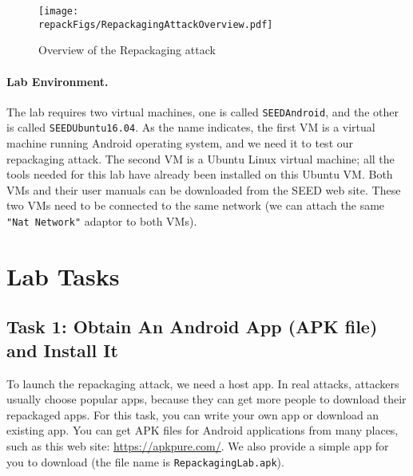 \begin{figure}[htb]
  \begin{center}
    \texttt{[image: \\repackFigs/RepackagingAttackOverview.pdf]}
  \end{center}
  \caption{Overview of the Repackaging attack}
  \label{fig:repackaging:overview}
\end{figure}

 
\paragraph{Lab Environment.}
The lab requires two virtual machines, one is called \texttt{SEEDAndroid}, and the other is called
\texttt{SEEDUbuntu16.04}. As the name indicates, the first VM is a virtual machine running Android
operating system, and we need it to test our repackaging attack. The second
VM is a Ubuntu Linux virtual machine; all the tools needed for
this lab have already been installed on this Ubuntu VM.
Both VMs and their user manuals can be downloaded from the SEED web site. These two VMs need to
be connected to the same network (we can attach the same \texttt{"Nat Network"} adaptor to both
VMs).







\section{Lab Tasks}




\subsection{Task 1: Obtain An Android App (APK file) and Install It}


To launch the repackaging attack, we need a host app. In real attacks, attackers usually choose popular
apps, because they can get more people to download their repackaged apps.
For this task, you can write your own app or download an existing app.
You can get APK files for Android applications from many places, such as
this web site: \url{https://apkpure.com/}. We also provide a simple app for you to download
(the file name is \texttt{RepackagingLab.apk}).


